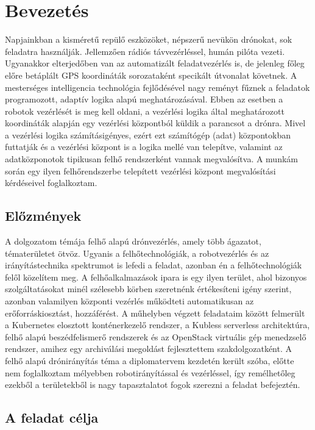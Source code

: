\chapter{Bevezetés}

Napjainkban a kisméretű repülő eszközöket, népszerű nevükön drónokat, sok feladatra használják. Jellemzően rádiós távvezérléssel, humán pilóta vezeti. Ugyanakkor elterjedőben van az automatizált feladatvezérlés is, de jelenleg főleg előre betáplált GPS koordináták sorozataként specikált útvonalat követnek. A mesterséges intelligencia technológia fejlődésével nagy reményt fűznek a feladatok programozott, adaptív logika alapú meghatározásával. Ebben az esetben a robotok vezérlését is meg kell oldani, a vezérlési logika által meghatározott koordináták alapján egy vezérlési központból küldik a parancsot a drónra. Mivel a vezérlési logika számításigényes, ezért ezt számítógép (adat) központokban futtatják és a vezérlési központ is a logika mellé van telepítve, valamint az adatközponotok tipikusan felhő rendszerként vannak megvalósítva. A munkám során egy ilyen felhőrendszerbe telepített vezérlési központ megvalósítási kérdéseivel foglalkoztam.

\section{Előzmények}

A dolgozatom témája felhő alapú drónvezérlés, amely több ágazatot, tématerületet ötvöz. Ugyanis a felhőtechnológiák, a robotvezérlés és az irányítástechnika spektrumot is lefedi a feladat, azonban én a felhőtechnológiák felől közelítem meg. A felhőalkalmazások ipara is egy ilyen terület, ahol bizonyos szolgáltatásokat minél szélesebb körben szeretnénk értékesíteni igény szerint, azonban valamilyen központi vezérlés működteti automatikusan az erőforráskiosztást, hozzáférést. A műhelyben végzett feladataim között felmerült a Kubernetes elosztott konténerkezelő rendszer, a Kubless serverless architektúra, felhő alapú beszédfelismerő rendszerek és az OpenStack virtuális gép menedzselő rendszer, amihez egy archiválási megoldást fejlesztettem szakdolgozatként. A felhő alapú drónirányítás téma a diplomatervem kezdetén került szóba, előtte nem foglalkoztam mélyebben robotirányítással és vezérléssel, így remélhetőleg ezekből a területekből is nagy tapasztalatot fogok szerezni a feladat befejeztén.

\section{A feladat célja}


